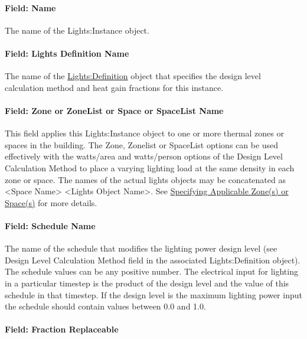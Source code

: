 \paragraph{Field: Name}\label{field-name-2-020-lights-instance}

The name of the Lights:Instance object.

\paragraph{Field: Lights Definition Name}\label{field-lights-definition-name}

The name of the \hyperref[lightsdefinition]{Lights:Definition} object that specifies the design level calculation method and heat gain fractions for this instance.

\paragraph{Field: Zone or ZoneList or Space or SpaceList Name}\label{lights-field-zone-or-zonelist-name-000-lights-instance}

This field applies this Lights:Instance object to one or more thermal zones or spaces in the building. The Zone, Zonelist or SpaceList options can be used effectively with the watts/area and watts/person options of the Design Level Calculation Method to place a varying lighting load at the same density in each zone or space. The names of the actual lights objects may be concatenated as \textless{}Space Name\textgreater{} \textless{}Lights Object Name\textgreater{}. See \hyperref[specifying-applicable-zones-or-spaces]{Specifying Applicable Zone(s) or Space(s)} for more details.

\paragraph{Field: Schedule Name}\label{field-schedule-name-002-lights-instance}

The name of the schedule that modifies the lighting power design level (see Design Level Calculation Method field in the associated Lights:Definition object). The schedule values can be any positive number. The electrical input for lighting in a particular timestep is the product of the design level and the value of this schedule in that timestep. If the design level is the maximum lighting power input the schedule should contain values between 0.0 and 1.0.

\paragraph{Field: Fraction Replaceable}\label{field-fraction-replaceable-lights-instance}

